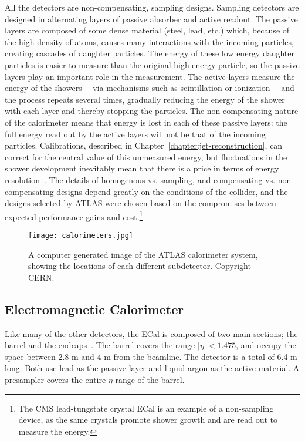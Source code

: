 All the detectors are non-compensating, sampling designs. Sampling detectors are designed in alternating layers of passive absorber and active readout. The passive layers are composed of some dense material (steel, lead, etc.) which, because of the high density of atoms, causes many interactions with the incoming particles, creating cascades of daughter particles. The energy of these low energy daughter particles is easier to measure than the original high energy particle, so the passive layers play an important role in the measurement. The active layers measure the energy of the showers--- via mechanisms such as scintillation or ionization--- and the process repeats several times, gradually reducing the energy of the shower with each layer and thereby stopping the particles. The non-compensating nature of the calorimeter means that energy is lost in each of these passive layers: the full energy read out by the active layers will not be that of the incoming particles. Calibrations, described in Chapter~\ref{chapter:jet-reconstruction}, can correct for the central value of this unmeasured energy, but fluctuations in the shower development inevitably mean that there is a price in terms of energy resolution~\cite{Wigmans}. The details of homogenous vs. sampling, and compensating vs. non-compensating designs depend greatly on the conditions of the collider, and the designs selected by ATLAS were chosen based on the compromises between expected performance gains and cost.\footnote{The CMS lead-tungstate crystal ECal is an example of a non-sampling device, as the same crystals promote shower growth and are read out to measure the energy.}




\begin{figure}
\centering
\texttt{[image: calorimeters.jpg]}
\label{fig:detector:calo}
\caption{A computer generated image of the ATLAS calorimeter system, showing the locations of each different subdetector. Copyright CERN.}
\end{figure}



\subsection{Electromagnetic Calorimeter}

Like many of the other detectors, the ECal is composed of two main sections; the barrel and the endcaps~\cite{ATLASPaper}. The barrel covers the range $|\eta| < 1.475$, and occupy the space between 2.8 m and 4 m from the beamline. The detector is a total of 6.4 m long. Both use lead as the passive layer and liquid argon as the active material. A presampler covers the entire $\eta$ range of the barrel.

